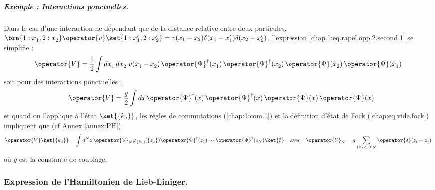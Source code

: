 \begin{mdframed}[
	linewidth=0.5pt, 
	backgroundcolor=gray!5, 
	roundcorner=50pt,	
	innerleftmargin=5pt,
    innerrightmargin=5pt,
    innertopmargin=-10pt,
    innerbottommargin=2pt,
    leftmargin=2pt,
    rightmargin=2pt
	]
\subparagraph{Exemple : Interactions ponctuelles.} 
Dans le cas d’une interaction ne dépendant que de la distance relative entre deux particules, $\bra{ 1 : x_1^{}, 2 : x_2^{} } \operator{v} \ket{ 1 : x_1', 2 : x_2' } = v(x_1 -x_2)\delta(x_1 - x_1')\delta(x_2 - x_2') $,  l'expression \eqref{chap.1:eq.rapel.opp.2.second.1} se simplifie :
\begin{eqnarray}
     \operator{V} =  
    \frac{1}{2} \int dx_1^{} \, dx_2^{} \; v(x_1^{} - x_2^{}) \,
    \operator{\Psi}^\dagger(x_1^{}) \, \operator{\Psi}^\dagger(x_2^{}) \, 
    \operator{\Psi}(x_2^{}) \, \operator{\Psi}(x_1^{})
    \label{eq:V_local}
\end{eqnarray} 
soit pour des interactions ponctuelles :	
\begin{eqnarray}\label{chap.1:eq.rapel.opp.2.second.ponctuel.1}
	\quad \operator{V}  = \frac{g}{2} \int dx \,
    \operator{\Psi}^\dagger(x) \, \operator{\Psi}^\dagger(x) \, 
    \operator{\Psi}(x) \, \operator{\Psi}(x)  		
\end{eqnarray}
et quand on l'applique à l'état $\ket{\{k_a\}}$, les règles de commutations (\ref{chap:1:com.1}) et la définition d'état de Fock (\ref{chap:eq.vide.fock}) impliquent que (cf Annex \ref{annex:PH})
\begin{eqnarray}\label{chap.1:eq.rapel.opp.2.second.ponctuel.2}
\operator{V}\ket{\{k_a \}} =  \int d^Nz \, \operator{\mathcal{V}}_N \varphi_{\{k_a\}}( \{z_a\} )\operator{\Psi}^\dag(z_1)\cdots \operator{\Psi}^\dag(z_N) \ket{\emptyset} \, \quad \mbox{avec} \quad  \operator{\mathcal{V}}_N 	= g\sum_{1\leq i < j \leq N } \operator{\delta}(z_i - z_j)	
\end{eqnarray}
où \( g \) est la constante de couplage.
\end{mdframed}




\subsubsection{Expression de l’Hamiltonien de Lieb-Liniger. }\label{chap1:sssec:LL}

